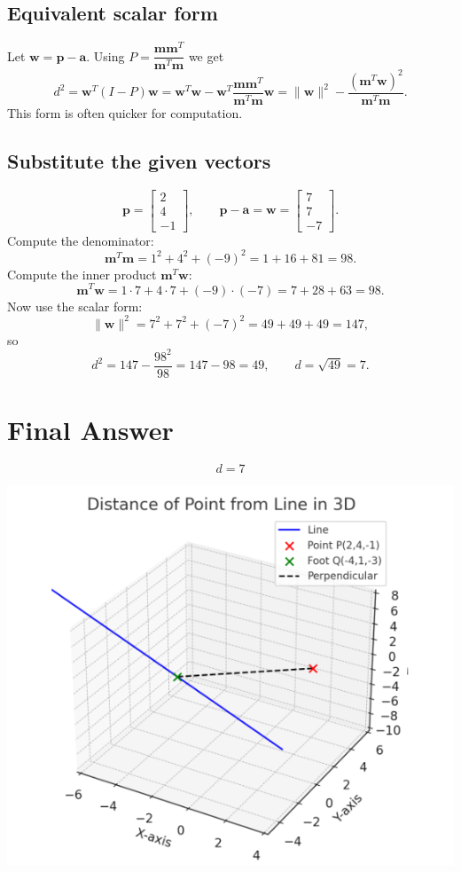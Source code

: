 \documentclass[journal]{IEEEtran}
\begin{document}
\subsection*{Equivalent scalar form}
Let \(\mathbf w=\mathbf p-\mathbf a\). Using \(P=\dfrac{\mathbf m\mathbf m^{T}}{\mathbf m^{T}\mathbf m}\) we get
\[
d^{2}=\mathbf w^{T}(I-P)\mathbf w
= \mathbf w^{T}\mathbf w - \mathbf w^{T}\frac{\mathbf m\mathbf m^{T}}{\mathbf m^{T}\mathbf m}\mathbf w
= \lVert\mathbf w\rVert^{2} - \frac{(\mathbf m^{T}\mathbf w)^{2}}{\mathbf m^{T}\mathbf m}.
\]
This form is often quicker for computation.

\subsection*{Substitute the given vectors}
\[
\mathbf p=\begin{bmatrix}2\\[2pt]4\\[2pt]-1\end{bmatrix},\qquad
\mathbf p-\mathbf a=\mathbf w=\begin{bmatrix}7\\[2pt]7\\[2pt]-7\end{bmatrix}.
\]
Compute the denominator:
\[
\mathbf m^{T}\mathbf m = 1^{2}+4^{2}+(-9)^{2}=1+16+81=98.
\]
Compute the inner product \(\mathbf m^{T}\mathbf w\):
\[
\mathbf m^{T}\mathbf w = 1\cdot 7 + 4\cdot 7 + (-9)\cdot(-7) = 7+28+63=98.
\]
Now use the scalar form:
\[
\lVert\mathbf w\rVert^{2} = 7^{2}+7^{2}+(-7)^{2}=49+49+49=147,
\]
so
\[
d^{2}=147-\frac{98^{2}}{98}=147-98=49,
\qquad d=\sqrt{49}=7.
\]

\section*{Final Answer}
\[
\boxed{\,d=7\,}
\]

\begin{center}
    \includegraphics[width=0.8\columnwidth]{figs/plot7.png}
\end{center}
\end{document}
